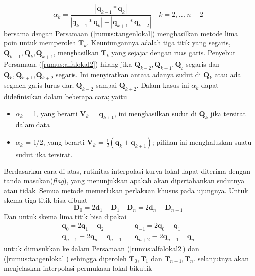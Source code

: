 \begin{equation}
	\alpha_k = \frac{\left | \textbf{q}_{k-1} * \textbf{q}_k \right |}
	{\left | \textbf{q}_{k-1}*\textbf{q}_k \right | + 
	\left | \textbf{q}_{k+1}*\textbf{q}_{k+2} \right |} \quad
	k = 2,...,n-2
	\label{rumus:alfalokal2} 
\end{equation}
bersama dengan Persamaan (\ref{rumus:tangenlokal}) 
menghasilkan metode lima poin untuk memperoleh $\textbf{T}_k$. 
Keuntungannya adalah tiga titik yang segaris, $\textbf{Q}_{k-1}, 
\textbf{Q}_k, \textbf{Q}_{k+1}$, menghasilkan $\textbf{T}_k$ yang 
sejajar dengan ruas garis. Penyebut Persamaan 
(\ref{rumus:alfalokal2}) hilang jika $\textbf{Q}_{k-2}, 
\textbf{Q}_{k-1}, \textbf{Q}_k$ segaris dan $\textbf{Q}_k, 
\textbf{Q}_{k+1}, \textbf{Q}_{k+2}$ segaris. Ini 
menyiratkan antara adanya sudut di $\textbf{Q}_k$ atau 
ada segmen garis lurus dari $\textbf{Q}_{k-2}$ sampai 
$\textbf{Q}_{k+2}$. Dalam kasus ini $\alpha_k$ dapat 
didefinisikan dalam beberapa cara; yaitu
\begin{itemize}
	\item $\alpha_k$ = 1, yang berarti $\textbf{V}_k$ = 
	$\textbf{q}_{k+1}$, ini menghasilkan sudut di 
	$\textbf{Q}_k$ jika tersirat dalam data
	\item $\alpha_k$ = 1/2, yang berarti $\textbf{V}_k$ = 
	$\frac{1}{2}(\textbf{q}_k+\textbf{q}_{k+1})$; 
	pilihan ini menghaluskan suatu sudut jika tersirat.
\end{itemize}
Berdasarkan cara di atas, rutinitas interpolasi 
kurva lokal dapat diterima dengan tanda masukan(\textit{flag}), 
yang menunjukkan apakah akan dipertahankan sudutnya 
atau tidak. Semua metode memerlukan perlakuan khusus 
pada ujungnya. Untuk skema tiga titik bisa dibuat
\begin{equation}
	\textbf{D}_0 = 2\textbf{d}_1 - \textbf{D}_1 \quad
	\textbf{D}_n = 2\textbf{d}_n - \textbf{D}_{n-1}
	\label{rumus:turunantigatitik} 
\end{equation}
Dan untuk skema lima titik bisa dipakai
\begin{equation}
	\begin{split}
		\textbf{q}_0 = 2\textbf{q}_1 - \textbf{q}_2 \quad & 
		\textbf{q}_{-1} = 2\textbf{q}_0 - \textbf{q}_1 \\
		\textbf{q}_{n+1} = 2\textbf{q}_n - \textbf{q}_{n-1} \quad & 
		\textbf{q}_{n+2} = 2\textbf{q}_{n+1} - \textbf{q}_n
	\end{split}
	\label{rumus:turunanlimatitik}
\end{equation}
untuk dimasukkan ke dalam Persamaan (\ref{rumus:alfalokal2}) 
dan (\ref{rumus:tangenlokal}) sehingga diperoleh 
$\textbf{T}_0, \textbf{T}_1$ dan 
$\textbf{T}_{n-1}, \textbf{T}_n$. 
selanjutnya akan menjelaskan interpolasi 
permukaan lokal bikubik

